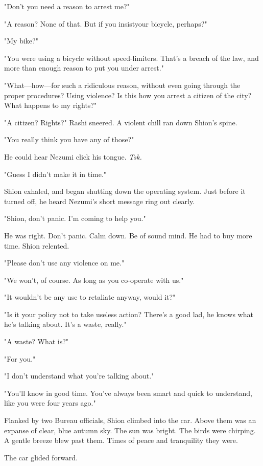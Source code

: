 "Don't you need a reason to arrest me?"

"A reason? None of that. But if you insist\el your bicycle, perhaps?"

"My bike?"

"You were using a bicycle without speed-limiters. That's a breach of the
law, and more than enough reason to put you under arrest."

"What---how---for such a ridiculous reason, without even going through the
proper procedures? Using violence? Is this how you arrest a citizen of
the city? What happens to my rights?"

"A citizen? Rights?" Rashi sneered. A violent chill ran down Shion's
spine.

"You really think you have any of those?"

He could hear Nezumi click his tongue. \emph{Tsk.}

"Guess I didn't make it in time."

Shion exhaled, and began shutting down the operating system. Just before
it turned off, he heard Nezumi's short message ring out clearly.

"Shion, don't panic. I'm coming to help you."

\mybreak

He was right. Don't panic. Calm down. Be of sound mind. He had to buy
more time. Shion relented.

"Please don't use any violence on me."

"We won't, of course. As long as you co-operate with us."

"It wouldn't be any use to retaliate anyway, would it?"

"Is it your policy not to take useless action? There's a good lad, he
knows what he's talking about. It's a waste, really."

"A waste? What is?"

"For you."

"I don't understand what you're talking about."

"You'll know in good time. You've always been smart and quick to
understand, like you were four years ago."

Flanked by two Bureau officials, Shion climbed into the car. Above them
was an expanse of clear, blue autumn sky. The sun was bright. The birds
were chirping. A gentle breeze blew past them. Times of peace and
tranquility they were.

\myspace

The car glided forward.

